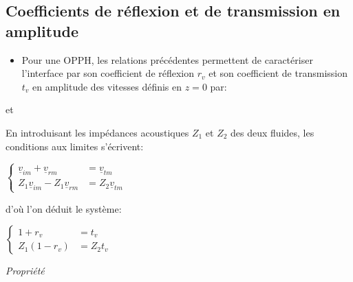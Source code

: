 \documentclass[a4paper, 12pt]{article}
\begin{document}
\subsection{Coefficients de réflexion et de transmission en amplitude}

\begin{itemize}
\item Pour une OPPH, les relations précédentes permettent de caractériser l'interface par son coefficient de réflexion $r_{v}$ et son coefficient de transmission $t_{v}$ en amplitude des vitesses définis en $z = 0$ par:
\end{itemize}
\begin{center}
 et 
\end{center}

En introduisant les impédances acoustiques $Z_{1}$ et $Z_{2}$ des deux fluides, les conditions aux limites s'écrivent:
\begin{center}
$\begin{cases}
\underline{v}_{im}+\underline{v}_{rm} & =\underline{v}_{tm}\\
Z_{1}\underline{v}_{im}-Z_{1}\underline{v}_{rm} & =Z_{2}\underline{v}_{tm}
\end{cases}$
\end{center}

d'où l'on déduit le système:
\begin{center}
$\begin{cases}
1+r_{v} & =t_{v}\\
Z_{1}(1-r_{v}) & =Z_{2}t_{v}
\end{cases}$
\end{center}

\textit{Propriété}

\noindent{}
\end{document}
